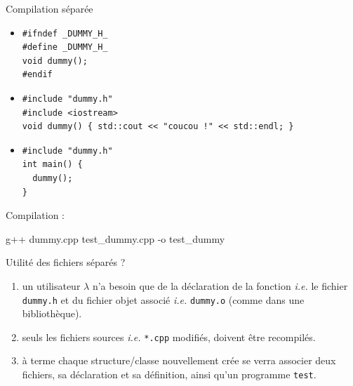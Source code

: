 \documentclass[c]{beamer}
\begin{document}
\begin{frame}[<+->][fragile]{Compilation séparée}
 \begin{itemize}
\item {}
\begin{verbatim}
#ifndef _DUMMY_H_
#define _DUMMY_H_
void dummy();
#endif
\end{verbatim}

\item {}
\begin{verbatim}
#include "dummy.h"
#include <iostream>
void dummy() { std::cout << "coucou !" << std::endl; }
\end{verbatim}

\item {}
\begin{verbatim}
#include "dummy.h"
int main() {
  dummy();
}
\end{verbatim}
\end{itemize}

\pause
Compilation :
\begin{prompt}
g++ dummy.cpp test\_dummy.cpp -o test\_dummy
\end{prompt}
\end{frame}



\begin{frame}[<+->][fragile]{Utilité des fichiers séparés ?}
 \begin{enumerate}
\item {} un utilisateur \(\lambda\) n'a besoin que de la
déclaration de la fonction \emph{i.e.} le fichier \texttt{dummy.h} et du fichier objet
associé \emph{i.e.} \texttt{dummy.o} (comme dans une bibliothèque).

\item {} seuls les fichiers sources \emph{i.e.} \texttt{*.cpp} modifiés,
doivent être recompilés.

\item {} à terme chaque structure/classe nouvellement
crée se verra associer deux fichiers, sa déclaration et sa définition, ainsi
qu'un programme \texttt{test}.
\end{enumerate}
\end{frame}
\end{document}
